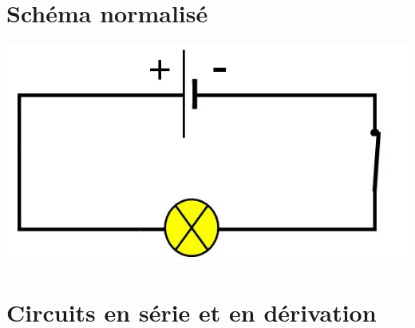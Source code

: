 \documentclass[xcolor={dvipsnames}]{beamer}
\begin{document}
\section{Schéma normalisé}
\begin{frame}
	
	
	\begin{center}
		\includegraphics[scale=0.5]{../img/schema}
	\end{center}
\end{frame}


\section{Circuits en série et en dérivation}
\end{document}
